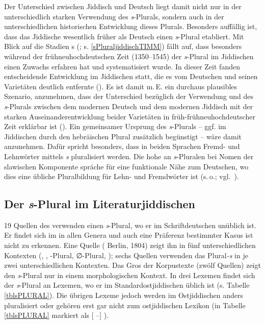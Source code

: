  Der Unterschied zwischen Jiddisch und Deutsch liegt damit nicht nur in der unterschiedlich starken Verwendung des \textit{s}-Plurals, sondern auch in der unterschiedlichen historischen Entwicklung 
dieses Plurals. 
Besonders auffällig ist, dass das Jiddische wesentlich früher als Deutsch einen \textit{s}-Plural etabliert. Mit Blick auf die Stadien \citeauthor{Timm2007}s (\citeyear{Timm2007};
 s. \ref{sPluraljiddischTIMM}) fällt auf, dass besonders während der frühneuhochdeutschen Zeit (1350–1545) der \textit{s}-Plural im Jiddischen einen Zuwachs erfahren hat und systematisiert wurde. In dieser Zeit fanden entscheidende Entwicklung im Jiddischen statt, die es vom Deutschen und seinen Varietäten deutlich entfernte (\citealt{Timm2005,Santorini1992, Santorini1993b, Santorini1993a}). Es ist damit m.\,E. ein durchaus plausibles Szenario, anzunehmen, dass der Unterschied bezüglich der Verwendung und  des \textit{s}-Plurals zwischen 
dem modernen
Deutsch und
dem modernen Jiddisch mit der starken Auseinanderentwicklung beider Varietäten in früh-frühneuhochdeutscher Zeit erklärbar ist (\citealt{Timm2005}). Ein gemeinsamer Ursprung des \textit{s}-Plurals – ggf. im Jiddischen durch den hebräischen Plural zusätzlich begünstigt – wäre damit anzunehmen. Dafür spricht besonders, dass in beiden Sprachen Fremd- und Lehnwörter mittels \textit{s} pluralisiert werden. Die hohe  an \textit{s}-Pluralen bei Nomen der slawischen Komponente spräche für eine funktionale Nähe zum Deutschen, wo dies eine übliche Pluralbildung für Lehn- und Fremdwörter ist (s.\,o.; vgl.\, \citealt{Wegener2004}). 
 
 
 
  \subsection{Der \textit{s}-Plural im Literaturjiddischen}\label{sPluralLiJi}
  19 Quellen des  verwenden einen \textit{s}-Plural, wo er im Schriftdeutschen unüblich ist. Er findet sich im  in allen Genera und auch eine Präferenz bestimmter Kasus ist nicht zu erkennen. Eine Quelle ( Berlin, 1804) zeigt ihn in fünf unterschiedlichen Kontexten (, , \textschwa-Plural, ∅-Plural, ); sechs Quellen verwenden das Plural\textit{-s} in je zwei unterschiedlichen Kontexten. Das Gros der Korpustexte (zwölf Quellen) zeigt den \textit{s}-Plural nur in einem morphologischen Kontext. In drei Lexemen findet sich der \textit{s}-Plural an Lexemen, wo er im Standardostjiddischen üblich ist  (s. Tabelle \ref{tblsPLURAL}). Die übrigen Lexeme jedoch werden im Ostjiddischen anders pluralisiert oder gehören erst gar nicht zum ostjiddischen Lexikon (in Tabelle  \ref{tblsPLURAL} markiert als [{\oj} –] ). 
  

